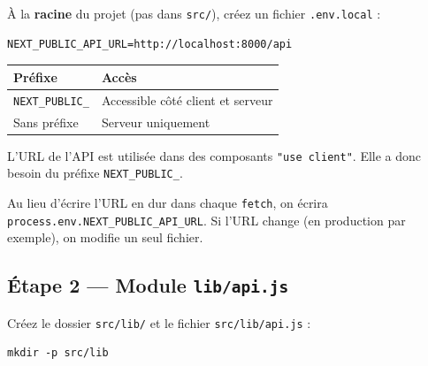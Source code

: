 \documentclass[11pt,a4paper]{article}
\begin{document}
À la \textbf{racine} du projet (pas dans \texttt{src/}), créez un fichier \texttt{.env.local} :

\begin{lstlisting}[style=terminal]
NEXT_PUBLIC_API_URL=http://localhost:8000/api
\end{lstlisting}

\begin{retenirbox}
\begin{center}
\begin{tabular}{lp{7cm}}
\toprule
\textbf{Préfixe} & \textbf{Accès} \\
\midrule
\texttt{NEXT\_PUBLIC\_} & Accessible côté client et serveur \\
Sans préfixe & Serveur uniquement \\
\bottomrule
\end{tabular}
\end{center}
L'URL de l'API est utilisée dans des composants \texttt{"use client"}. Elle a donc besoin du préfixe \texttt{NEXT\_PUBLIC\_}.

Au lieu d'écrire l'URL en dur dans chaque \texttt{fetch}, on écrira \texttt{process.env.NEXT\_PUBLIC\_API\_URL}. Si l'URL change (en production par exemple), on modifie un seul fichier.
\end{retenirbox}

\subsection{Étape 2 --- Module \texttt{lib/api.js}}

Créez le dossier \texttt{src/lib/} et le fichier \texttt{src/lib/api.js} :

\begin{lstlisting}[style=terminal]
mkdir -p src/lib
\end{lstlisting}
\end{document}
